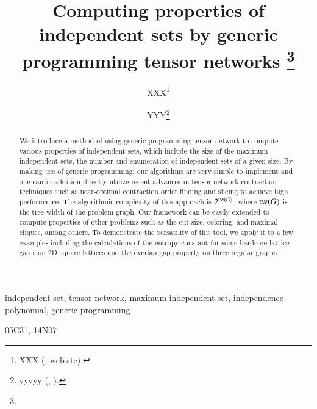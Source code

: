 \documentclass[onefignum, onetabnum]{siamart190516}
\title{Computing properties of independent sets by generic programming tensor networks
\thanks{\funding{...}}
}
\author{XXX\thanks{XXX 
  (\email{email}, \url{website}).}
\and YYY\thanks{yyyyy 
  (\email{yyyy}, \email{email}).}
}
\newcommand{\<}{\langle}
\renewcommand{\>}{\rangle}
\newcounter{example}
\begin{document}
\maketitle

\begin{abstract}
We introduce a method of using generic programming tensor network to compute various properties of independent sets,
which include the size of the maximum independent sets, the number and enumeration of independent sets of a given size.
By making use of generic programming, our algorithms are very simple to implement and one can in addition directly utilize recent advances in tensor network contraction techniques such as near-optimal contraction order finding and slicing to achieve high performance.
The algorithmic complexity of this approach is $2^{{\rm tw}(G)}$, where ${\rm tw} (G)$ is the tree width of the problem graph.
Our framework can be easily extended to compute properties of other problems such as the cut size, coloring, and maximal cliques, among others.
To demonstrate the versatility of this tool, we apply it to a few examples including the calculations of the entropy constant for some hardcore lattice gases on 2D square lattices and the overlap gap property on three regular graphs.
\end{abstract}

\begin{keywords}
independent set, tensor network, maximum independent set, independence polynomial, generic programming
\end{keywords}

\begin{AMS}
  05C31, 14N07
\end{AMS}
\end{document}
